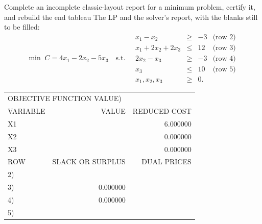 \begin{worked}{Complete an incomplete classic-layout report for a minimum problem, certify it, and rebuild the end tableau}
The LP and the solver's report, with the blanks still to be filled:
\[
  \min\; C=4x_{1}-2x_{2}-5x_{3}
  \quad\text{s.t.}\quad
  \begin{array}{rcrl}
    x_{1}-x_{2} &\ge& -3 & \text{(row 2)}\\
    x_{1}+2x_{2}+2x_{3} &\le& 12 & \text{(row 3)}\\
    2x_{2}-x_{3} &\ge& -3 & \text{(row 4)}\\
    x_{3} &\le& 10 & \text{(row 5)}\\
    x_{1},x_{2},x_{3} &\ge& 0 .
  \end{array}
\]
\begin{center}\footnotesize\ttfamily
\begin{tabular}{lrr}
\multicolumn{3}{l}{OBJECTIVE FUNCTION VALUE\quad 1)\ \underline{\hspace{3em}}}\\[3pt]
VARIABLE & VALUE & REDUCED COST\\
X1 & \underline{\hspace{3em}} & 6.000000\\
X2 & \underline{\hspace{3em}} & 0.000000\\
X3 & \underline{\hspace{3em}} & 0.000000\\[3pt]
ROW & SLACK OR SURPLUS & DUAL PRICES\\
2) & \underline{\hspace{3em}} & \underline{\hspace{3em}}\\
3) & 0.000000 & \underline{\hspace{3em}}\\
4) & 0.000000 & \underline{\hspace{3em}}\\
5) & \underline{\hspace{3em}} & \underline{\hspace{3em}}\\
\end{tabular}


\end{center}
\end{worked}
